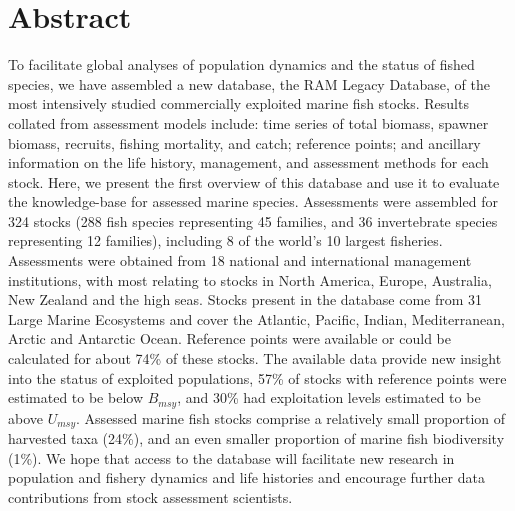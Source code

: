 \section*{Abstract}


To facilitate global analyses of population dynamics and the status of
fished species, we have assembled a new database, the RAM Legacy
Database, of the most intensively studied commercially exploited
marine fish stocks. Results collated from assessment models include:
time series of total biomass, spawner biomass, recruits, fishing
mortality, and catch; reference points; and ancillary information on
the life history, management, and assessment methods for each stock.
Here, we present the first overview of this database and use it to
evaluate the knowledge-base for assessed marine species.  Assessments
were assembled for 324 stocks
(288 fish species representing
45 families, and 36
invertebrate species representing 12
families), including 8 of the world's 10 largest fisheries.
Assessments were obtained from 18 national and international
management institutions, with most relating to stocks in North
America, Europe, Australia, New Zealand and the high seas. Stocks
present in the database come from 31 Large
Marine Ecosystems and cover the Atlantic, Pacific, Indian,
Mediterranean, Arctic and Antarctic Ocean. Reference points were
available or could be calculated for about
74\% of these stocks. The available data
provide new insight into the status of exploited populations,
57\% of stocks with reference points
were estimated to be below $B_{msy}$, and
30\% had exploitation levels
estimated to be above $U_{msy}$.  Assessed marine fish stocks comprise
a relatively small proportion of harvested taxa (24\%), and an even
smaller proportion of marine fish biodiversity (1\%). We hope that
access to the database will facilitate new research in population and
fishery dynamics and life histories and encourage further data
contributions from stock assessment scientists.

